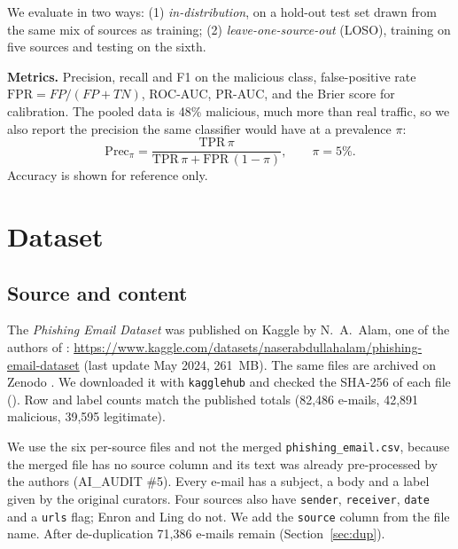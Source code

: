 \documentclass[11pt,a4paper]{article}
\begin{document}
We evaluate in two ways: (1) \emph{in-distribution}, on a hold-out test set drawn from the same mix of sources as training; (2) \emph{leave-one-source-out} (LOSO), training on five sources and testing on the sixth.

\textbf{Metrics.} Precision, recall and F1 on the malicious class, false-positive rate $\mathrm{FPR}=FP/(FP+TN)$, ROC-AUC, PR-AUC, and the Brier score for calibration. The pooled data is 48\% malicious, much more than real traffic, so we also report the precision the same classifier would have at a prevalence $\pi$:
\begin{equation}
\mathrm{Prec}_\pi = \frac{\mathrm{TPR}\,\pi}{\mathrm{TPR}\,\pi + \mathrm{FPR}\,(1-\pi)}, \qquad \pi = 5\%.
\end{equation}
Accuracy is shown for reference only.

\section{Dataset}\label{sec:dataset}
\subsection{Source and content}
\begingroup\sloppy
The \emph{Phishing Email Dataset} was published on Kaggle by N.~A.~Alam, one of the authors of \cite{alsubaiey2024}: \url{https://www.kaggle.com/datasets/naserabdullahalam/phishing-email-dataset} (last update May 2024, 261~MB). The same files are archived on Zenodo \cite{champa_zenodo}. We downloaded it with \texttt{kagglehub} and checked the SHA-256 of each file (). Row and label counts match the published totals (82,486 e-mails, 42,891 malicious, 39,595 legitimate).
\endgroup

We use the six per-source files and not the merged \texttt{phishing\_email.csv}, because the merged file has no source column and its text was already pre-processed by the authors (AI\_AUDIT \#5). Every e-mail has a subject, a body and a label given by the original curators. Four sources also have \texttt{sender}, \texttt{receiver}, \texttt{date} and a \texttt{urls} flag; Enron and Ling do not. We add the \texttt{source} column from the file name. After de-duplication 71,386 e-mails remain (Section~\ref{sec:dup}).
\end{document}
